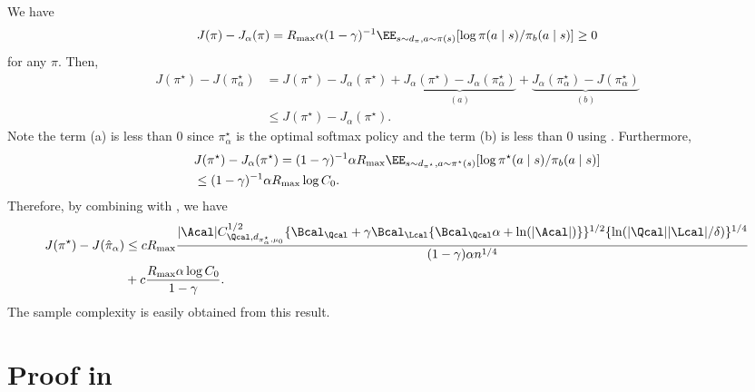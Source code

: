 We have  
\begin{align}\label{eq:helpful_inequality}
    J(\pi)-J_{\alpha}(\pi)=R_{\max} \alpha (1-\gamma)^{-1}\EE_{s\sim d_{\pi},a\sim \pi(s)}[\log \pi(a\mid s)/\pi_b(a\mid s)]\geq 0
\end{align}
for any $\pi$. Then, 
\begin{align*}
    J(\pi^{\star})-J(\pi^{\star}_{\alpha}) &=J(\pi^{\star})-J_{\alpha}(\pi^{\star})+\underbrace{J_{\alpha}(\pi^{\star})-J_{\alpha}(\pi^{\star}_{\alpha})}_{(a)}+\underbrace{J_{\alpha}(\pi^{\star}_{\alpha})-  J(\pi^{\star}_{\alpha})}_{(b)}\\
    &\leq J(\pi^{\star})-J_{\alpha}(\pi^{\star}). 
\end{align*}
Note the term (a) is less than $0$ since $\pi^{\star}_{\alpha}$ is the optimal softmax policy and the term (b) is less than $0$ using . Furthermore, 
\begin{align*}
    & J(\pi^{\star})-J_{\alpha}(\pi^{\star})= (1-\gamma)^{-1}\alpha R_{\max} \EE_{s\sim d_{\pi^{\star}},a\sim \pi^{\star}(s)}[\log \pi^{\star}(a\mid s)/\pi_b(a\mid s)] \\
    &\leq (1-\gamma)^{-1}\alpha R_{\max} \log C_0. 
\end{align*}
Therefore, by combining with , we have
\begin{align*}
    J(\pi^{\star})-J(\hat \pi_{\alpha})&\leq c R_{\max}\frac{|\Acal| C^{1/2}_{\Qcal,d_{\pi^{\star}_{\alpha},\mu_0} }\{\Bcal_{\Qcal} + \gamma \Bcal_{\Lcal}\{\Bcal_{\Qcal} 
 \alpha +\ln(|\Acal|)\}\}^{1/2} 
    \{\ln(|\Qcal||\Lcal|/\delta)\}^{1/4}}{(1-\gamma)\alpha n^{1/4}}  \\
    &+ c\frac{R_{\max} \alpha \log C_0}{1 -\gamma}. 
\end{align*}
The sample complexity is easily obtained from this result. 



\section{ Proof in }



